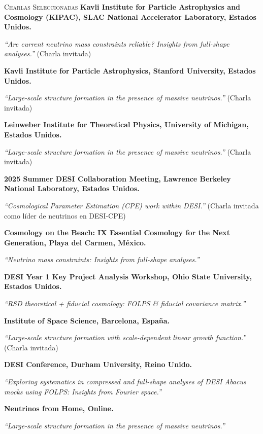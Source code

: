 \begin{rubric}{\faMicrophone \textsc{Charlas Seleccionadas}}
\entry*[]
        \textbf{Kavli Institute for Particle Astrophysics and Cosmology (KIPAC), SLAC National Accelerator Laboratory, Estados Unidos.} \par
    \emph{“Are current neutrino mass constraints reliable? Insights from full-shape analyses.”} (Charla invitada)


\entry*[]
        \textbf{Kavli Institute for Particle Astrophysics, Stanford University, Estados Unidos.} \par
    \emph{“Large-scale structure formation in the presence of massive neutrinos.”} (Charla invitada)

\entry*[]
        \textbf{Leinweber Institute for Theoretical Physics, University of Michigan, Estados Unidos.} \par
    \emph{“Large-scale structure formation in the presence of massive neutrinos.”} (Charla invitada)

\entry*[]
    	\textbf{2025 Summer DESI Collaboration Meeting, Lawrence Berkeley National Laboratory, Estados Unidos.} \par
    \emph{“Cosmological Parameter Estimation (CPE) work within DESI.”} (Charla invitada como líder de neutrinos en DESI-CPE)

\entry*[]%
    	\textbf{Cosmology on the Beach: IX Essential Cosmology for the Next Generation, Playa del Carmen, México.} \par
    \emph{“Neutrino mass constraints: Insights from full-shape analyses.”}

\entry*[]
    	\textbf{DESI Year 1 Key Project Analysis Workshop, Ohio State University, Estados Unidos.} \par
    \emph{“RSD theoretical + fiducial cosmology: FOLPS \& fiducial covariance matrix.”}

\entry*[]%
    	\textbf{Institute of Space Science, Barcelona, España.} \par
    \emph{“Large-scale structure formation with scale-dependent linear growth function.”} (Charla invitada)

\entry*[]%
    	\textbf{DESI Conference, Durham University, Reino Unido.} \par
    \emph{“Exploring systematics in compressed and full-shape analyses of DESI Abacus mocks using FOLPS: Insights from Fourier space.”}


\entry*[]%
    	\textbf{Neutrinos from Home, Online.} \par
    \emph{“Large-scale structure formation in the presence of massive neutrinos.”}


\end{rubric}
